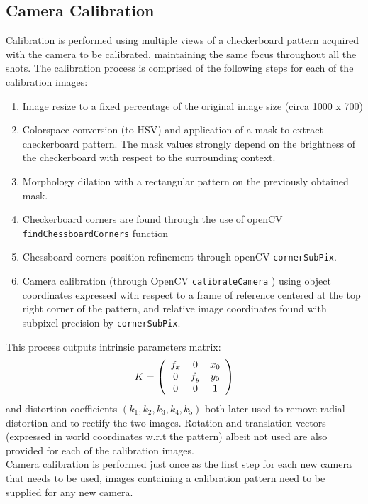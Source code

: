 \documentclass[12pt]{amsart}
\begin{document}
\subsection{Camera Calibration} \label{sec:calibration}
Calibration is performed using multiple views of a checkerboard pattern acquired with the camera to be calibrated, maintaining the same focus throughout all the shots.
The calibration process is comprised of the following steps for each of the calibration images:
\begin{enumerate}[label={\arabic*.}]
    \item Image resize to a fixed percentage of the original image size (circa 1000 x 700)
    \item Colorspace conversion (to HSV) and application of a mask to extract checkerboard pattern. 
    The mask values strongly depend on the brightness of the checkerboard with respect to the surrounding context.
    \item Morphology dilation with a rectangular pattern on the previously obtained mask.
    \item Checkerboard corners are found through the use of openCV \texttt{findChessboardCorners} function
    \item Chessboard corners position refinement through openCV \texttt{cornerSubPix}.
    \item Camera calibration (through OpenCV \texttt{calibrateCamera} \cite{calibration}) using object coordinates expressed with respect to a frame of reference centered at the top right corner of the pattern, 
    and relative image coordinates found with subpixel precision by \texttt{cornerSubPix}.
\end{enumerate}
This process outputs intrinsic parameters matrix: \[K = \left ( 
    \begin{array}{ c c c}
    f_x & 0   & x_0 \\
     0  & f_y & y_0 \\
     0  & 0   & 1 \\
    \end{array}
\right )\]
and distortion coefficients \((k_1, k_2, k_3, k_4, k_5)\) both later used to remove radial distortion and to rectify the two images.
Rotation and translation vectors (expressed in world coordinates w.r.t the pattern) albeit not used are also provided for each of the calibration images.
\\
Camera calibration is performed just once as the first step for each new camera that needs to be used, images containing a calibration pattern need to be supplied for any new camera.
\end{document}
